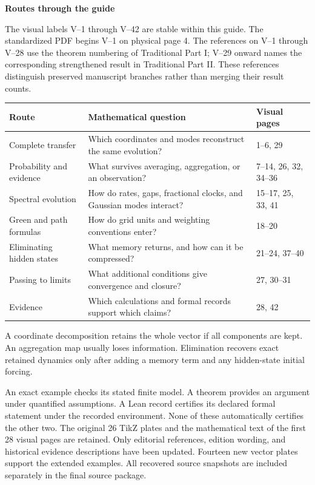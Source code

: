 
\thispagestyle{empty}
{\sffamily\bfseries\LARGE Routes through the guide\par}\vspace{12pt}
The visual labels V--1 through V--42 are stable within this guide. The standardized PDF begins V--1 on physical page 4. The references on V--1 through V--28 use the theorem numbering of Traditional Part I; V--29 onward names the corresponding strengthened result in Traditional Part II. These references distinguish preserved manuscript branches rather than merging their result counts.
\begin{center}\small
\begin{tabularx}{\linewidth}{@{}p{1.6in}Yl@{}}\toprule
Route & Mathematical question & Visual pages\\\midrule
Complete transfer & Which coordinates and modes reconstruct the same evolution? & 1--6, 29\\
Probability and evidence & What survives averaging, aggregation, or an observation? & 7--14, 26, 32, 34--36\\
Spectral evolution & How do rates, gaps, fractional clocks, and Gaussian modes interact? & 15--17, 25, 33, 41\\
Green and path formulas & How do grid units and weighting conventions enter? & 18--20\\
Eliminating hidden states & What memory returns, and how can it be compressed? & 21--24, 37--40\\
Passing to limits & What additional conditions give convergence and closure? & 27, 30--31\\
Evidence & Which calculations and formal records support which claims? & 28, 42\\\bottomrule
\end{tabularx}
\end{center}
A coordinate decomposition retains the whole vector if all components are kept. An aggregation map usually loses information. Elimination recovers exact retained dynamics only after adding a memory term and any hidden-state initial forcing.

An exact example checks its stated finite model. A theorem provides an argument under quantified assumptions. A Lean record certifies its declared formal statement under the recorded environment. None of these automatically certifies the other two.
The original 26 TikZ plates and the mathematical text of the first 28 visual pages are retained. Only editorial references, edition wording, and historical evidence descriptions have been updated. Fourteen new vector plates support the extended examples. All recovered source snapshots are included separately in the final source package.

